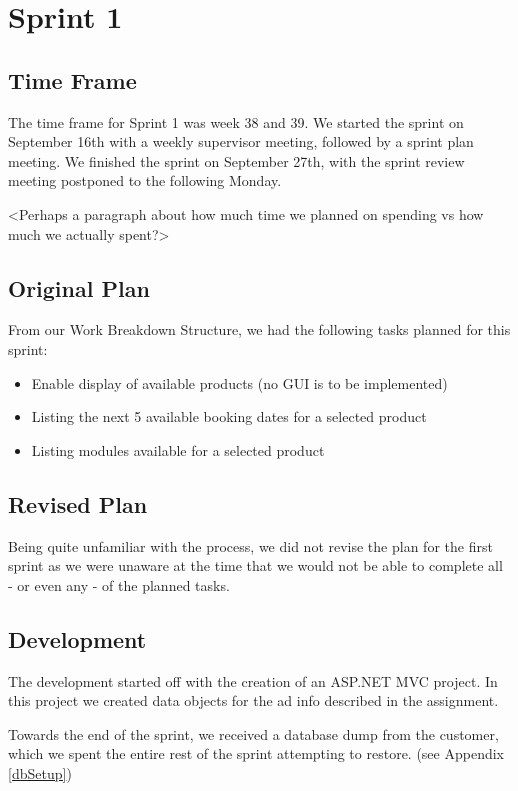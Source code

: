 \section{Sprint 1}

\subsection{Time Frame}
The time frame for Sprint 1 was week 38 and 39. We started the sprint on September 16th with a weekly supervisor meeting, followed by a sprint plan meeting. We finished the sprint on September 27th, with the sprint review meeting postponed to the following Monday.

<Perhaps a paragraph about how much time we planned on spending vs how much we actually spent?>

\subsection{Original Plan}
From our Work Breakdown Structure, we had the following tasks planned for this sprint:
\begin{itemize}
	\item Enable display of available products (no GUI is to be implemented)
	\item Listing the next 5 available booking dates for a selected product
	\item Listing modules available for a selected product
\end{itemize}

\subsection{Revised Plan}
Being quite unfamiliar with the process, we did not revise the plan for the first sprint as we were unaware at the time that we would not be able to complete all - or even any - of the planned tasks.

\subsection{Development}
The development started off with the creation of an ASP.NET MVC project. In this project we created data objects for the ad info described in the assignment.

Towards the end of the sprint, we received a database dump from the customer, which we spent the entire rest of the sprint attempting to restore. (see Appendix \ref{dbSetup})


